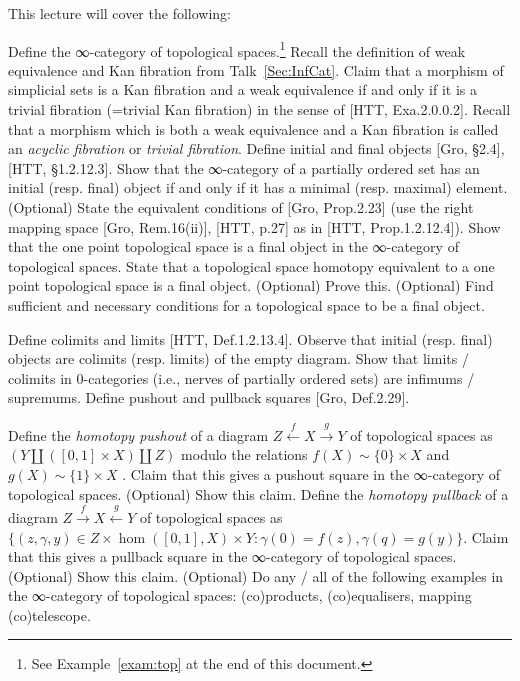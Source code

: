 \documentclass[a4paper]{amsart}
\numberwithin{figure}{section}
\theoremstyle{theorem}
\theoremstyle{definition}
\newcommand{\NN}{\mathbb{N}}
\newcommand{\Top}{{Top}}
\begin{document}
This lecture will cover the following:

Define the ∞-category of topological spaces.\footnote{%
See Example~\ref{exam:top} at the end of this document.
} %
Recall the definition of weak equivalence and Kan fibration from Talk~\ref{Sec:InfCat}. %
Claim that a morphism of simplicial sets is a Kan fibration and a weak equivalence if and only if it is a trivial fibration (=trivial Kan fibration) in the sense of [HTT, Exa.2.0.0.2]. %
Recall that a morphism which is both a weak equivalence and a Kan fibration is called an \emph{acyclic fibration} or \emph{trivial fibration}. %
Define initial and final objects [Gro, §2.4], [HTT, §1.2.12.3]. %
Show that the ∞-category of a partially ordered set has an initial (resp. final) object if and only if it has a minimal (resp. maximal) element. %
(Optional) State the equivalent conditions of [Gro, Prop.2.23] (use the right mapping space [Gro, Rem.16(ii)], [HTT, p.27] as in [HTT, Prop.1.2.12.4]). %
Show that the one point topological space is a final object in the ∞-category of topological spaces. %
State that a topological space homotopy equivalent to a one point topological space is a final object. %
(Optional) Prove this. %
(Optional) Find sufficient and necessary conditions for a topological space to be a final object. %

Define colimits and limits [HTT, Def.1.2.13.4]. %
Observe that initial (resp. final) objects are colimits (resp. limits) of the empty diagram. %
Show that limits / colimits in 0-categories (i.e., nerves of partially ordered sets) are infimums / supremums. %
Define pushout and pullback squares [Gro, Def.2.29]. %

Define the \emph{homotopy pushout} of a diagram $Z \stackrel{f}{\leftarrow} X \stackrel{g}{\to} Y$  of topological spaces as 
$(Y \amalg ([0,1]{\times} X) \amalg Z)$ modulo the relations $f(X) \sim \{0\} {\times} X$ and $g(X) \sim \{1\} {\times} X$
. %
Claim that this gives a pushout square in the ∞-category of topological spaces. %
(Optional) Show this claim. %
Define the \emph{homotopy pullback} of a diagram $Z \stackrel{f}{\rightarrow} X \stackrel{g}{\leftarrow} Y$  of topological spaces as $\{( z, \gamma, y) \in Z \times \hom([0,1], X) \times Y : \gamma(0) = f(z), \gamma(q) = g(y) \}$. %
Claim that this gives a pullback square in the ∞-category of topological spaces. %
(Optional) Show this claim. %
(Optional) Do any / all of the following examples in the ∞-category of topological spaces: (co)products, (co)equalisers, mapping (co)telescope. %
\end{document}
